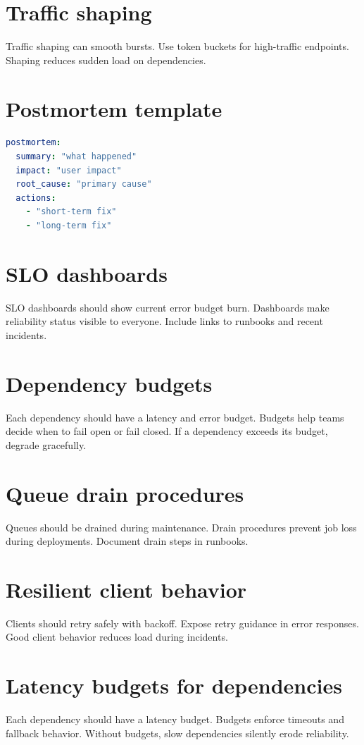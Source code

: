\section{Traffic shaping}
Traffic shaping can smooth bursts.
Use token buckets for high-traffic endpoints.
Shaping reduces sudden load on dependencies.

\section{Postmortem template}
\begin{lstlisting}[language=YAML]
postmortem:
  summary: "what happened"
  impact: "user impact"
  root_cause: "primary cause"
  actions:
    - "short-term fix"
    - "long-term fix"
\end{lstlisting}

\section{SLO dashboards}
SLO dashboards should show current error budget burn.
Dashboards make reliability status visible to everyone.
Include links to runbooks and recent incidents.

\section{Dependency budgets}
Each dependency should have a latency and error budget.
Budgets help teams decide when to fail open or fail closed.
If a dependency exceeds its budget, degrade gracefully.

\section{Queue drain procedures}
Queues should be drained during maintenance.
Drain procedures prevent job loss during deployments.
Document drain steps in runbooks.

\section{Resilient client behavior}
Clients should retry safely with backoff.
Expose retry guidance in error responses.
Good client behavior reduces load during incidents.

\section{Latency budgets for dependencies}
Each dependency should have a latency budget.
Budgets enforce timeouts and fallback behavior.
Without budgets, slow dependencies silently erode reliability.

